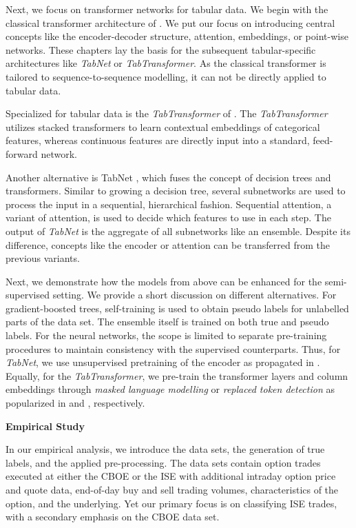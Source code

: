 Next, we focus on transformer networks for tabular data. We begin with the classical transformer architecture of \textcite{vaswaniAttentionAllYou2017}. We put our focus on introducing central concepts like the encoder-decoder structure, attention, embeddings, or point-wise networks. These chapters lay the basis for the subsequent tabular-specific architectures like \textit{TabNet} or \textit{TabTransformer}. As the classical transformer is tailored to sequence-to-sequence modelling, it can not be directly applied to tabular data.

Specialized for tabular data is the \textit{TabTransformer} of \textcite{huangTabTransformerTabularData2020}. The \textit{TabTransformer} utilizes stacked transformers to learn contextual embeddings of categorical features, whereas continuous features are directly input into a standard, feed-forward network.

Another alternative is TabNet \autocite{arikTabNetAttentiveInterpretable2020}, which fuses the concept of decision trees and transformers. Similar to growing a decision tree, several subnetworks are used to process the input in a sequential, hierarchical fashion. Sequential attention, a variant of attention, is used to decide which features to use in each step. The output of \textit{TabNet} is the aggregate of all subnetworks like an ensemble. Despite its difference, concepts like the encoder or attention can be transferred from the previous variants. 

Next, we demonstrate how the models from above can be enhanced for the semi-supervised setting. We provide a short discussion on different alternatives. For gradient-boosted trees, self-training \autocite{yarowskyUnsupervisedWordSense1995} is used to obtain pseudo labels for unlabelled parts of the data set. The ensemble itself is trained on both true and pseudo labels. For the neural networks, the scope is limited to separate pre-training procedures to maintain consistency with the supervised counterparts. Thus, for \textit{TabNet}, we use unsupervised pretraining of the encoder as propagated in \textcite{arikTabNetAttentiveInterpretable2020}. Equally, for the \textit{TabTransformer}, we pre-train the transformer layers and column embeddings through \textit{masked language modelling} or \textit{replaced token detection} as popularized in \textcite{devlinBERTPretrainingDeep2019} and \textcite{clarkELECTRAPretrainingText2020}, respectively. 

\textbf{Empirical Study}

In our empirical analysis, we introduce the data sets, the generation of true labels, and the applied pre-processing. The data sets contain option trades executed at either the \gls{CBOE} or the \gls{ISE} with additional intraday option price and quote data, end-of-day buy and sell trading volumes, characteristics of the option, and the underlying. Yet our primary focus is on classifying \gls{ISE} trades, with a secondary emphasis on the \gls{CBOE} data set. 

